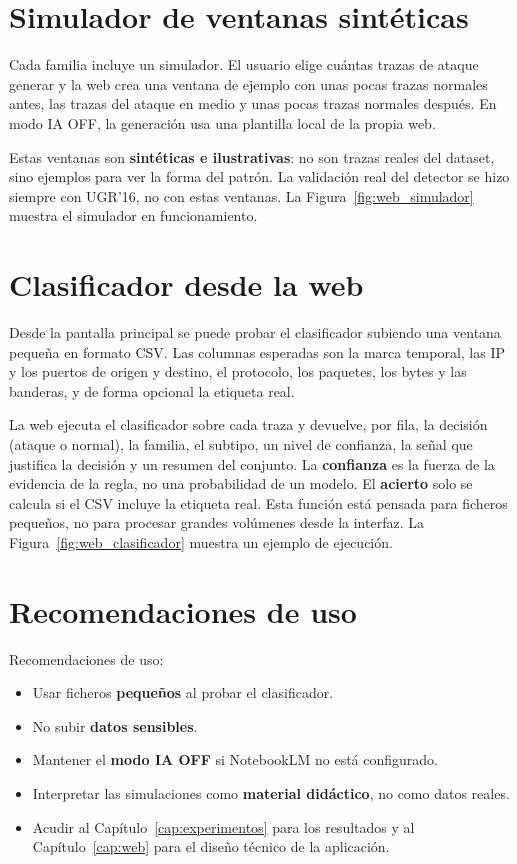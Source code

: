 \section{Simulador de ventanas sintéticas}
\label{sec:apa_simulador}

Cada familia incluye un simulador. El usuario elige cuántas trazas de ataque generar y la web crea una ventana de ejemplo con unas pocas trazas normales antes, las trazas del ataque en medio y unas pocas trazas normales después. En modo IA OFF, la generación usa una plantilla local de la propia web.

Estas ventanas son \textbf{sintéticas e ilustrativas}: no son trazas reales del dataset, sino ejemplos para ver la forma del patrón. La validación real del detector se hizo siempre con UGR'16, no con estas ventanas. La Figura~\ref{fig:web_simulador} muestra el simulador en funcionamiento.

\section{Clasificador desde la web}
\label{sec:apa_clasificador}

Desde la pantalla principal se puede probar el clasificador subiendo una ventana pequeña en formato CSV. Las columnas esperadas son la marca temporal, las IP y los puertos de origen y destino, el protocolo, los paquetes, los bytes y las banderas, y de forma opcional la etiqueta real.

La web ejecuta el clasificador sobre cada traza y devuelve, por fila, la decisión (ataque o normal), la familia, el subtipo, un nivel de confianza, la señal que justifica la decisión y un resumen del conjunto. La \textbf{confianza} es la fuerza de la evidencia de la regla, no una probabilidad de un modelo. El \textbf{acierto} solo se calcula si el CSV incluye la etiqueta real. Esta función está pensada para ficheros pequeños, no para procesar grandes volúmenes desde la interfaz. La Figura~\ref{fig:web_clasificador} muestra un ejemplo de ejecución.

\section{Recomendaciones de uso}
\label{sec:apa_recomendaciones}

Recomendaciones de uso:

\begin{itemize}
  \item Usar ficheros \textbf{pequeños} al probar el clasificador.
  \item No subir \textbf{datos sensibles}.
  \item Mantener el \textbf{modo IA OFF} si NotebookLM no está configurado.
  \item Interpretar las simulaciones como \textbf{material didáctico}, no como datos reales.
  \item Acudir al Capítulo~\ref{cap:experimentos} para los resultados y al Capítulo~\ref{cap:web} para el diseño técnico de la aplicación.
\end{itemize}
